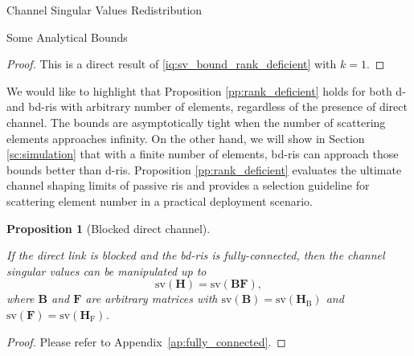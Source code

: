 \documentclass[journal]{IEEEtran}
\newtheorem{proposition}{Proposition}
\begin{document}
\begin{section}{Channel Singular Values Redistribution}
\begin{subsection}{Some Analytical Bounds}
		\begin{proof}
			This is a direct result of \eqref{iq:sv_bound_rank_deficient} with $k = 1$.
		\end{proof}

		We would like to highlight that Proposition \ref{pp:rank_deficient} holds for both \gls{d}- and \gls{bd}-\gls{ris} with arbitrary number of elements, regardless of the presence of direct channel.
		The bounds are asymptotically tight when the number of scattering elements approaches infinity.
		On the other hand, we will show in Section \ref{sc:simulation} that with a finite number of elements, \gls{bd}-\gls{ris} can approach those bounds better than \gls{d}-\gls{ris}.
		Proposition \ref{pp:rank_deficient} evaluates the ultimate channel shaping limits of passive \gls{ris} and provides a selection guideline for scattering element number in a practical deployment scenario.


		\begin{proposition}[Blocked direct channel]\label{pp:fully_connected}

			If the direct link is blocked and the \gls{bd}-\gls{ris} is fully-connected, then the channel singular values can be manipulated up to
			\begin{equation}
				\mathrm{sv}(\mathbf{H}) = \mathrm{sv}(\mathbf{BF}),
			\end{equation}
			where $\mathbf{B}$ and $\mathbf{F}$ are arbitrary matrices with $\mathrm{sv}(\mathbf{B})=\mathrm{sv}(\mathbf{H}_\mathrm{B})$ and $\mathrm{sv}(\mathbf{F})=\mathrm{sv}(\mathbf{H}_\mathrm{F})$.
		\end{proposition}

		\begin{proof}
			Please refer to Appendix~\ref{ap:fully_connected}.
		\end{proof}


\end{subsection}
\end{section}
\end{document}
